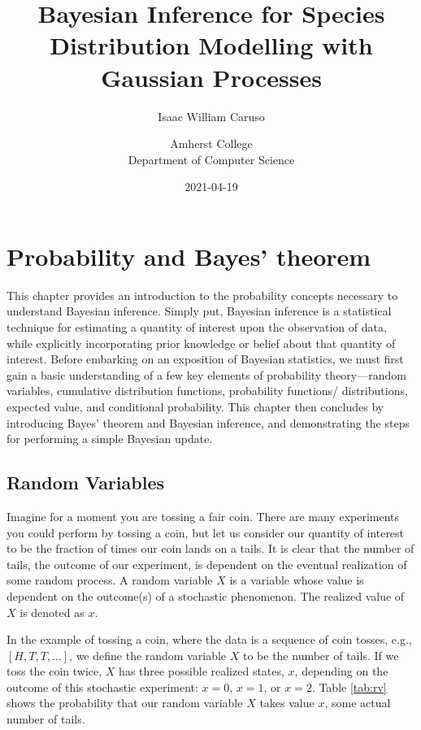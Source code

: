 \documentclass[
  12pt,
]{book}
\title{Bayesian Inference for Species Distribution Modelling with Gaussian Processes}
\subtitle{Isaac William Caruso}
\author{Amherst College\\
Department of Computer Science}
\date{2021-04-19}
\theoremstyle{definition}
\theoremstyle{definition}
\theoremstyle{definition}
\theoremstyle{remark}
\begin{document}
\maketitle

{
\setcounter{tocdepth}{1}
\tableofcontents
}
\hypertarget{probability-and-bayes-theorem}{%
\chapter{Probability and Bayes' theorem}\label{probability-and-bayes-theorem}}

This chapter provides an introduction to the probability concepts necessary to understand Bayesian inference.
Simply put, Bayesian inference is a statistical technique for estimating a quantity of interest upon the observation of data, while explicitly incorporating prior knowledge or belief about that quantity of interest.
Before embarking on an exposition of Bayesian statistics, we must first gain a basic understanding of a few key elements of probability theory---random variables, cumulative distribution functions, probability functions/ distributions, expected value, and conditional probability.
This chapter then concludes by introducing Bayes' theorem and Bayesian inference, and demonstrating the steps for performing a simple Bayesian update.

\hypertarget{random-variables}{%
\section{Random Variables}\label{random-variables}}

Imagine for a moment you are tossing a fair coin.
There are many experiments you could perform by tossing a coin, but let us consider our quantity of interest to be the fraction of times our coin lands on a tails.
It is clear that the number of tails, the outcome of our experiment, is dependent on the eventual realization of some random process.
A random variable \(X\) is a variable whose value is dependent on the outcome(s) of a stochastic phenomenon.
The realized value of \(X\) is denoted as \(x\).

In the example of tossing a coin, where the data is a sequence of coin tosses, e.g., \([H, T, T, …]\), we define the random variable \(X\) to be the number of tails.
If we toss the coin twice, \(X\) has three possible realized states, \(x\), depending on the outcome of this stochastic experiment: \(x = 0\), \(x = 1\), or \(x = 2\).
Table \ref{tab:rv} shows the probability that our random variable \(X\) takes value \(x\), some actual number of tails.
\end{document}
